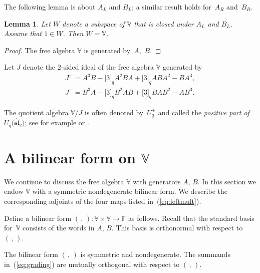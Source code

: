 \documentclass[11pt]{article}
\numberwithin{equation}{section}
\numberwithin{equation}{section}
\newtheorem{Lemma}[Theorem]{Lemma}
\begin{document}
{The following lemma is about $A_L$ and $B_L$; a similar result holds for~$A_R$ and~$B_R$.

\begin{Lemma}\label{lem:WAB} Let $W$ denote a subspace of $\mathbb V$ that is closed
under $A_L$ and $B_L$. Assume that $1 \in W$. Then $W=\mathbb V$.
\end{Lemma}
\begin{proof} The free algebra $\mathbb V$ is generated by~$A$,~$B$.
\end{proof}

\begin{Definition}\label{def:idealJ}Let $J$ denote the 2-sided ideal of the free algebra $\mathbb V$ generated by
\begin{gather}
J^+=A^3 B - \lbrack 3 \rbrack_q A^2 B A+ \lbrack 3 \rbrack_q A B A^2 - B A^3,\label{eq:jplus}\\
J^-= B^3 A - \lbrack 3 \rbrack_q B^2 A B+ \lbrack 3 \rbrack_q B A B^2 - A B^3.\label{eq:jminus}
\end{gather}
\end{Definition}

\begin{Definition}\label{def:pp}The quotient algebra $\mathbb V/J$ is often denoted by~$U^+_q$ and called the {\it positive part of $U_q\big({\widehat{\mathfrak{sl}}}_2\big)$}; see for example
\cite[p.~40]{hongkang} or \cite[Corollary~3.2.6]{lusztig}.
\end{Definition}

\section[A bilinear form on $\mathbb V$]{A bilinear form on $\boldsymbol{\mathbb V}$}\label{section4}

We continue to discuss the free algebra $\mathbb V$ with generators $A$, $B$. In this section we endow $\mathbb V$ with a symmetric nondegenerate bilinear form. We describe the
corresponding adjoints of the four maps listed in~(\ref{eq:leftmult}).

\begin{Definition}\label{def:bilf}\rm Define a bilinear form $(\, ,\,)\colon \mathbb V\times \mathbb V \to
\mathbb F$ as follows. Recall that the standard basis for~$\mathbb V$
consists of the words in $A$, $B$. This basis is orthonormal with respect to $(\,,\,)$.
\end{Definition}

The bilinear form $(\,,\,)$ is symmetric and nondegenerate. The summands in~(\ref{eq:grading}) are mutually orthogonal with respect to $(\,,\,)$.

}
\end{document}
